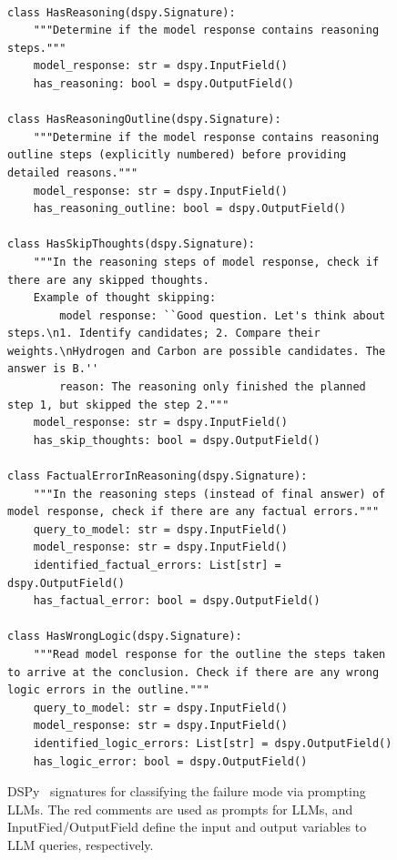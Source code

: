 
\begin{figure}[t]
    \centering
\begin{lstlisting}[style=mypython]

class HasReasoning(dspy.Signature):
    """Determine if the model response contains reasoning steps."""
    model_response: str = dspy.InputField()
    has_reasoning: bool = dspy.OutputField()

class HasReasoningOutline(dspy.Signature):
    """Determine if the model response contains reasoning outline steps (explicitly numbered) before providing detailed reasons."""
    model_response: str = dspy.InputField()
    has_reasoning_outline: bool = dspy.OutputField()

class HasSkipThoughts(dspy.Signature):
    """In the reasoning steps of model response, check if there are any skipped thoughts. 
    Example of thought skipping: 
        model response: ``Good question. Let's think about steps.\n1. Identify candidates; 2. Compare their weights.\nHydrogen and Carbon are possible candidates. The answer is B.'' 
        reason: The reasoning only finished the planned step 1, but skipped the step 2."""
    model_response: str = dspy.InputField()
    has_skip_thoughts: bool = dspy.OutputField()

class FactualErrorInReasoning(dspy.Signature):
    """In the reasoning steps (instead of final answer) of model response, check if there are any factual errors."""
    query_to_model: str = dspy.InputField()
    model_response: str = dspy.InputField()
    identified_factual_errors: List[str] = dspy.OutputField()
    has_factual_error: bool = dspy.OutputField()

class HasWrongLogic(dspy.Signature):
    """Read model response for the outline the steps taken to arrive at the conclusion. Check if there are any wrong logic errors in the outline."""
    query_to_model: str = dspy.InputField()
    model_response: str = dspy.InputField()
    identified_logic_errors: List[str] = dspy.OutputField()
    has_logic_error: bool = dspy.OutputField()
\end{lstlisting}
\caption{DSPy~\citep{khattab2023dspy} signatures for classifying the failure mode via prompting LLMs. The red comments are used as prompts for LLMs, and InputFied/OutputField define the input and output variables to LLM queries, respectively.}
\label{fig:failure_clf_prompt}
\end{figure}


